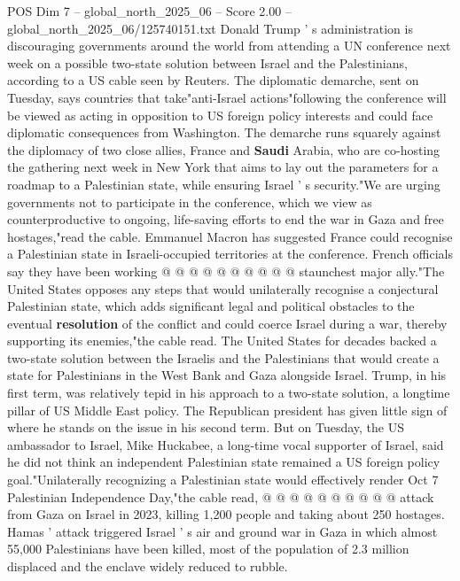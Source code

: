 \begin{textsample}{POS Dim 7 – global\_north\_2025\_06 – Score 2.00 – global\_north\_2025\_06/125740151.txt}  \label{ex:f7_pos_377}
Donald Trump ' s administration is discouraging governments around the world from attending a UN conference next week on a possible two-state solution between Israel and the Palestinians, according to a US cable seen by Reuters.
The diplomatic demarche, sent on Tuesday, says countries that take"anti-Israel actions"following the conference will be viewed as acting in opposition to US foreign policy interests and could face diplomatic consequences from Washington.
The demarche runs squarely against the diplomacy of two close allies, France and \textbf{Saudi} Arabia, who are co-hosting the gathering next week in New York that aims to lay out the parameters for a roadmap to a Palestinian state, while ensuring Israel ' s security."We are urging governments not to participate in the conference, which we view as counterproductive to ongoing, life-saving efforts to end the war in Gaza and free hostages,"read the cable.
Emmanuel Macron has suggested France could recognise a Palestinian state in Israeli-occupied territories at the conference.
French officials say they have been working @ @ @ @ @ @ @ @ @ @ staunchest major ally."The United States opposes any steps that would unilaterally recognise a conjectural Palestinian state, which adds significant legal and political obstacles to the eventual \textbf{resolution} of the conflict and could coerce Israel during a war, thereby supporting its enemies,"the cable read.
The United States for decades backed a two-state solution between the Israelis and the Palestinians that would create a state for Palestinians in the West Bank and Gaza alongside Israel.
Trump, in his first term, was relatively tepid in his approach to a two-state solution, a longtime pillar of US Middle East policy.
The Republican president has given little sign of where he stands on the issue in his second term.
But on Tuesday, the US ambassador to Israel, Mike Huckabee, a long-time vocal supporter of Israel, said he did not think an independent Palestinian state remained a US foreign policy goal."Unilaterally recognizing a Palestinian state would effectively render Oct 7 Palestinian Independence Day,"the cable read, @ @ @ @ @ @ @ @ @ @ attack from Gaza on Israel in 2023, killing 1,200 people and taking about 250 hostages.
Hamas ' attack triggered Israel ' s air and ground war in Gaza in which almost 55,000 Palestinians have been killed, most of the population of 2.3 million displaced and the enclave widely reduced to rubble.

\end{textsample}
